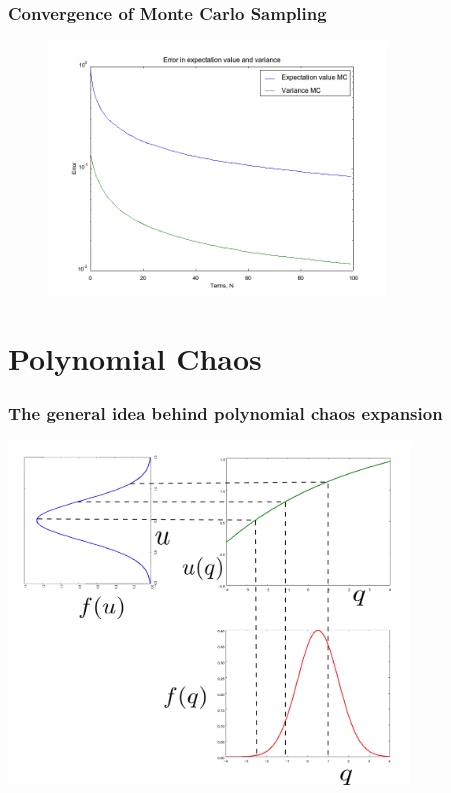 \documentclass[handout]{beamer}
\begin{document}
\begin{frame}
  \frametitle{Convergence of Monte Carlo Sampling}

  \begin{figure}
    \includegraphics[width=0.8\textwidth]{MC_convergence_only_1D.png}
  \end{figure}
  
\end{frame}



\section{Polynomial Chaos}


\begin{frame}
  \frametitle{The general idea behind polynomial chaos expansion}
   \includegraphics[width=0.8\textwidth]{mapping.png}
\end{frame}
\end{document}
